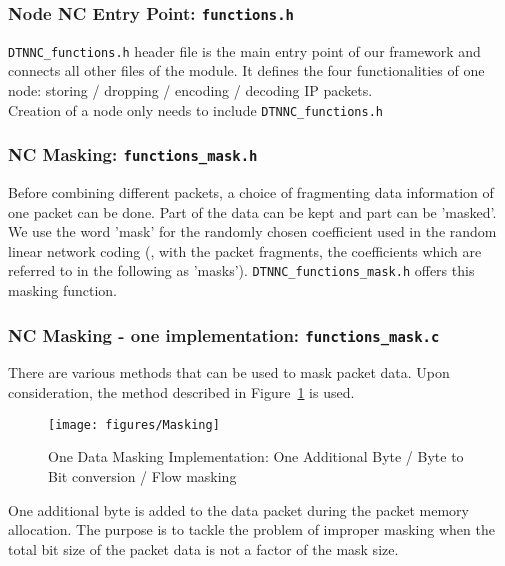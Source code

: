 \documentclass[a4paper,twoside]{article}
\begin{document}
\subsubsection{Node NC Entry Point: \texttt{functions.h}}

\texttt{DTNNC\_functions.h} header file is the main entry point of our framework and connects all other files of the module. It defines the four functionalities of one node: storing / dropping / encoding / decoding IP packets. \\

\noindent Creation of a node only needs to include \texttt{DTNNC\_functions.h}



\subsubsection{NC Masking: \texttt{functions\_mask.h}}

Before combining different packets, a choice of fragmenting data information of one packet can be done. Part of the data can be kept and part can be 'masked'. We use the word 'mask' for the randomly chosen coefficient used in the random linear network coding (, with  the packet fragments,  the coefficients which are referred to in the following as 'masks'). \texttt{DTNNC\_functions\_mask.h} offers this masking function.



\subsubsection{NC Masking - one implementation: \texttt{functions\_mask.c}}

There are various methods that can be used to mask packet data. Upon consideration, the method described in Figure~\ref{fig:masking} is used.

\begin{figure}[!hbt]
\centering
\texttt{[image: figures/Masking]}
\caption{One Data Masking Implementation: One Additional Byte / Byte to Bit conversion / Flow masking}
\label{fig:masking}
\end{figure}

One additional byte is added to the data packet during the packet memory allocation. The purpose is to tackle the problem of improper masking when the total bit size of the packet data is not a factor of the mask size. 
\end{document}
